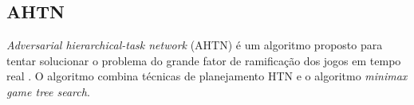 


\subsection{AHTN} 

\textit{Adversarial hierarchical-task network} (AHTN) é um algoritmo proposto para tentar solucionar o problema do grande fator de ramificação dos jogos em tempo real \cite{ontanon2015adversarial}. O algoritmo combina técnicas de planejamento HTN e o algoritmo \textit{minimax game tree search}. 

